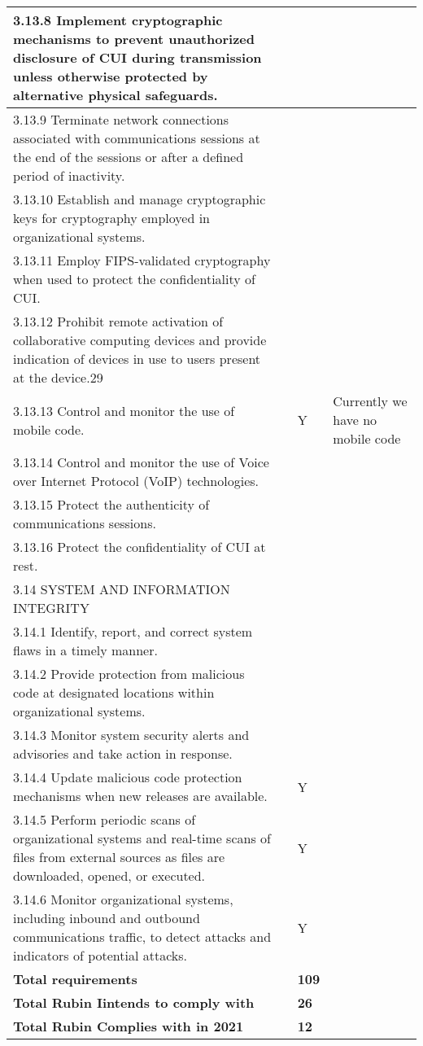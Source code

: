 \begin{longtable} {|p{}|p{}|p{}|p{} |}
{3.13.8 Implement cryptographic mechanisms to prevent unauthorized disclosure of CUI during transmission unless otherwise protected by alternative physical safeguards.}&&& \\ \hline
{3.13.9 Terminate network connections associated with communications sessions at the end of the sessions or after a defined period of inactivity.}&&& \\ \hline
{3.13.10 Establish and manage cryptographic keys for cryptography employed in organizational systems.}&&& \\ \hline
{3.13.11 Employ FIPS-validated cryptography when used to protect the confidentiality of CUI.}&&& \\ \hline
{3.13.12 Prohibit remote activation of collaborative computing devices and provide indication of devices in use to users present at the device.29}&&& \\ \hline
{3.13.13 Control and monitor the use of mobile code.}&{}&{Y}&{Currently we have no mobile code} \\ \hline
{3.13.14 Control and monitor the use of Voice over Internet Protocol (VoIP) technologies.}&&& \\ \hline
{3.13.15 Protect the authenticity of communications sessions.}&&& \\ \hline
{3.13.16 Protect the confidentiality of CUI at rest.}&&& \\ \hline
{3.14 SYSTEM AND INFORMATION INTEGRITY}&&& \\ \hline
{3.14.1 Identify, report, and correct system flaws in a timely manner.}&&& \\ \hline
{3.14.2 Provide protection from malicious code at designated locations within organizational systems.}&&& \\ \hline
{3.14.3 Monitor system security alerts and advisories and take action in response.}&&& \\ \hline
{3.14.4 Update malicious code protection mechanisms when new releases are available.}&{}&{Y}& \\ \hline
{3.14.5 Perform periodic scans of organizational systems and real-time scans of files from external sources as files are downloaded, opened, or executed.}&{}&{Y}& \\ \hline
{3.14.6 Monitor organizational systems, including inbound and outbound communications traffic, to detect attacks and indicators of potential attacks.}&{}&{Y}& \\ \hline
\textbf{Total requirements}&\textbf{}&\textbf{109}& \\ \hline
\textbf{Total Rubin Iintends to comply with }&\textbf{}&\textbf{26}& \\ \hline
\textbf{Total Rubin Complies with in 2021}&\textbf{}&\textbf{12}& \\ \hline
\end{longtable} \normalsize
